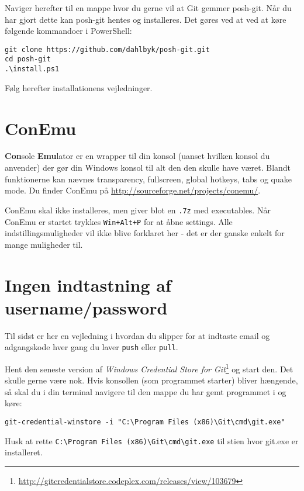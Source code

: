 Naviger herefter til en mappe hvor du gerne vil at Git gemmer posh-git.
Når du har gjort dette kan posh-git hentes og installeres.
Det gøres ved at ved at køre følgende kommandoer i PowerShell:
\begin{lstlisting}
git clone https://github.com/dahlbyk/posh-git.git
cd posh-git
.\install.ps1
\end{lstlisting}
Følg herefter installationens vejledninger.

\section{ConEmu}
\textbf{Con}sole \textbf{Emu}lator er en wrapper til din konsol (uanset hvilken konsol du anvender) der gør din Windows konsol til alt den den skulle have været.
Blandt funktionerne kan nævnes transparency, fullscreen, global hotkeys, tabs og quake mode.
Du finder ConEmu på \url{http://sourceforge.net/projects/conemu/}.

ConEmu skal ikke installeres, men giver blot en \texttt{.7z} med executables.
Når ConEmu er startet trykkes \texttt{Win+Alt+P} for at åbne settings.
Alle indstillingsmuligheder vil ikke blive forklaret her - det er der ganske enkelt for mange muligheder til.

\section{Ingen indtastning af username/password}
Til sidst er her en vejledning i hvordan du slipper for at indtaste email og adgangskode hver gang du laver \texttt{push} eller \texttt{pull}.

Hent den seneste version af \textit{Windows Credential Store for Git}\footnote{\url{http://gitcredentialstore.codeplex.com/releases/view/103679}} og start den.
Det skulle gerne være nok.
Hvis konsollen (som programmet starter) bliver hængende, så skal du i din terminal navigere til den mappe du har gemt programmet i og køre:
\begin{lstlisting}
git-credential-winstore -i "C:\Program Files (x86)\Git\cmd\git.exe"
\end{lstlisting}
Husk at rette \lstinline!C:\Program Files (x86)\Git\cmd\git.exe! til stien hvor git.exe er installeret.
